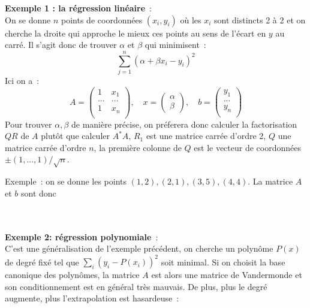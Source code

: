 \documentclass[a4paper,11pt]{book}
\begin{document}
\begin{giacjshere}
{\bf Exemple 1 : la r\'egression lin\'eaire}~:\\
On se donne $n$ points de coordonn\'ees $(x_i,y_i)$ o\`u les $x_i$
sont distincts 2 \`a 2 et on cherche
la droite qui approche le mieux ces points au sens de l'\'ecart en $y$
au carr\'e. Il s'agit donc de trouver $\alpha$ et $\beta$ qui minimisent~:
$$  \sum_{j=1}^n (\alpha+\beta x_i-y_i)^2 $$
Ici on a~:
$$ A=\left( \begin{array}{cc}
1 & x_1 \\
... & ... \\
1 & x_n  \\
\end{array} \right), \quad 
x=\left( \begin{array}{c} \alpha \\ \beta \end{array}\right),
\quad
b=\left( \begin{array}{c}
y_1  \\
...  \\
y_n  \\
\end{array} 
\right)$$
Pour trouver $\alpha, \beta$ de mani\`ere pr\'ecise, on pr\'eferera
donc calculer la factorisation $QR$ de $A$ plut\^ot que calculer $A^*A$, $R_1$ est
une matrice carr\'ee d'ordre 2, $Q$ une matrice carr\'ee d'ordre $n$, 
la premi\`ere colonne de $Q$ est le vecteur de coordonn\'ees
$\pm (1,...,1)/\sqrt{n}$.

Exemple~: on se donne les points $(1,2), (2,1), (3,5), (4,4)$. La
matrice $A$ et $b$ sont donc\\
\\
\\

{\bf Exemple 2: r\'egression polynomiale}~:\\
C'est une g\'en\'eralisation de l'exemple pr\'ec\'edent, on cherche un polyn\^ome $P(x)$
de degr\'e fix\'e tel que $\sum_i (y_i-P(x_i))^2$ soit minimal. Si on
choisit la base canonique des polyn\^omes, la
matrice $A$ est alors une matrice de Vandermonde 
et son conditionnement est en g\'en\'eral tr\`es mauvais. 
De plus, plus le degr\'e augmente, plus l'extrapolation 
est hasardeuse~:\\
\\


\end{giacjshere}
\end{document}
